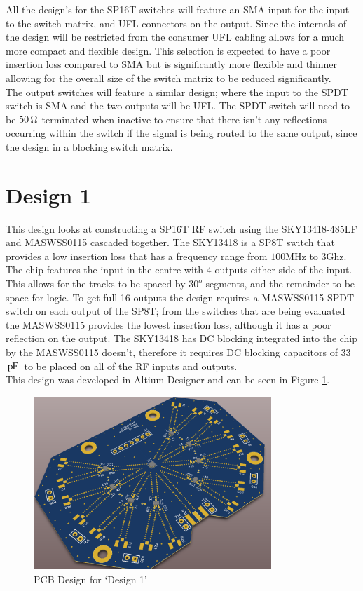 \documentclass[12pt,openany,a4paper]{book}
\newcommand{\pack}	{\hspace{-0.08em}}
\newcommand{\pF}	{\ensuremath{\rm\,p\pack F}}
\newcommand{\ohm}	{\ensuremath{\rm\,\Omega}}
\begin{document}
All the design's for the SP16T switches will feature an SMA input for the input to the switch matrix, and UFL connectors on the output. Since the internals of the design will be restricted from the consumer UFL cabling allows for a much more compact and flexible design. This selection is expected to have a poor insertion loss compared to SMA but is significantly more flexible and thinner allowing for the overall size of the switch matrix to be reduced significantly.\\
The output switches will feature a similar design; where the input to the SPDT switch is SMA and the two outputs will be UFL. The SPDT switch will need to be $50\ohm$ terminated when inactive to ensure that there isn't any reflections occurring within the switch if the signal is being routed to the same output, since the design in a blocking switch matrix.  

\section{Design 1}		\label{sec:design1}
This design looks at constructing a SP16T RF switch using the SKY13418-485LF and MASWSS0115 cascaded together. The SKY13418 is a SP8T switch that provides a low insertion loss that has a frequency range from $100$MHz to $3$Ghz.  The chip features the input in the centre with $4$ outputs either side of the input. This allows for the tracks to be spaced by $30^o$ segments, and the remainder to be space for logic. To get full 16 outputs the design requires a MASWSS0115 SPDT switch on each output of the SP8T; from the switches that are being evaluated the MASWSS0115 provides the lowest insertion loss, although it has a poor reflection on the output. The SKY13418 has DC blocking integrated into the chip by the MASWSS0115 doesn't, therefore it requires DC blocking capacitors of $33$\pF \ to be placed on all of the RF inputs and outputs. \\[0.2cm]
This design was developed in Altium Designer and can be seen in Figure \ref{fig:design1}.
\begin{figure}[H]
	\centering
    \includegraphics[width=0.8\textwidth]{design1_pcb.png}
	\caption{PCB Design for `Design 1'}
	\label{fig:design1}
\end{figure} 
\end{document}
